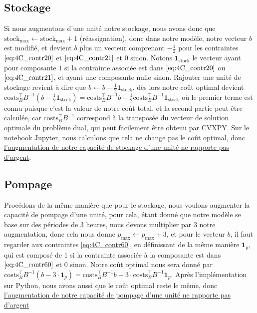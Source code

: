 \documentclass{article}
\begin{document}
\subsection*{Stockage}
Si nous augmentons d'une unité notre stockage, nous avons donc que $\mathrm{stock}_\mathrm{max} \leftarrow \mathrm{stock}_\mathrm{max} + 1$ (réassignation), donc dans notre modèle,
notre vecteur $b$ est modifié, et devient $b$ plus un vecteur comprenant $- \frac{1}{2}$ pour les contraintes 
$\eqref{eq:4C_contr20}$ et $\eqref{eq:4C_contr21}$ et 0 sinon. Notons $\mathbf{1}_{\mathrm{stock}}$ le vecteur ayant pour composante $1$ si 
la contrainte associée est dans $\eqref{eq:4C_contr20}$ ou $\eqref{eq:4C_contr21}$, et ayant une composante nulle sinon. Rajouter une unité de stockage 
revient à dire que $b \leftarrow b  - \frac{1}{2} \mathbf{1}_{\mathrm{stock}}$, 
dès lors notre coût optimal devient $\mathrm{costs}^\intercal_{B} B^{-1} \left( b - \frac{1}{2} \mathbf{1}_{\mathrm{stock}} \right) 
= \mathrm{costs}^\intercal_{B} B^{-1} b - \frac{1}{2} \mathrm{costs}^\intercal_{B} B^{-1} \mathbf{1}_{\mathrm{stock}}  $ où le premier terme
est connu puisque c'est la valeur de notre coût total, et la second partie peut être calculée, car $\mathrm{costs}^\intercal_{B} B^{-1}$ correspond
à la transposée du vecteur de solution optimale du problème dual, qui peut facilement être obtenu par CVXPY. Sur le notebook Jupyter, nous calculons 
que cela ne change pas le coût optimal, donc \underline{l'augmentation de notre capacité de stockage d'une unité ne rapporte pas d'argent}.

\subsection*{Pompage}
Procédons de la même manière que pour le stockage, nous voulons augmenter la capacité de pompage d'une unité, pour cela, étant donné que
notre modèle se base sur des périodes de 3 heures, nous devons multiplier par 3 notre augmentation, donc cela nous donne $p_\mathrm{max} \leftarrow p_\mathrm{max} + 3$,
et pour le vecteur $b$, il faut regarder aux contraintes \eqref{eq:4C_contr60}, en définissant de la même manière $\mathbf{1}_{\mathrm{p}}$, qui est composé
de $1$ si la contrainte associée à la composante est dans $\eqref{eq:4C_contr60}$ et $0$ sinon. Notre coût optimal nous sera donné par 
$\mathrm{costs}^\intercal_{B} B^{-1} \left( b - 3 \cdot \mathbf{1}_{p} \right) 
= \mathrm{costs}^\intercal_{B} B^{-1} b - 3 \cdot \mathrm{costs}^\intercal_{B} B^{-1} \mathbf{1}_{p}  $.
Après l'implémentation sur Python, nous avons aussi que le coût optimal reste le même, donc \underline{l'augmentation de notre capacité de pompage d'une unité 
ne rapporte pas d'argent}
\end{document}
